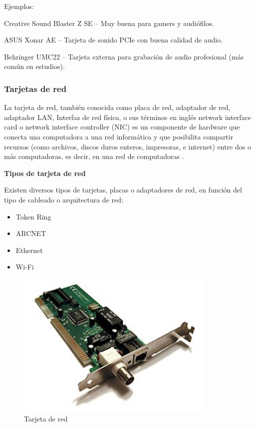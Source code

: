 Ejemplos:

Creative Sound Blaster Z SE – Muy buena para gamers y audiófilos.

ASUS Xonar AE – Tarjeta de sonido PCIe con buena calidad de audio.

Behringer UMC22 – Tarjeta externa para grabación de audio profesional (más común en estudios).

\subsubsection{Tarjetas de red}

La tarjeta de red, también conocida como placa de red, adaptador de red, adaptador LAN, Interfaz de red física, o sus términos en inglés network interface card o network interface controller (NIC) es un componente de hardware que conecta una computadora a una red informática y que posibilita compartir recursos (como archivos, discos duros enteros, impresoras, e internet) entre dos o más computadoras, es decir, en una red de computadoras \cite{wikitarjred}.

\textbf{Tipos de tarjeta de red}

Existen diversos tipos de tarjetas, placas o adaptadores de red, en función del tipo de cableado o arquitectura de red:

\begin{itemize}
  \item Token Ring
  \item ARCNET
  \item Ethernet
  \item Wi-Fi
\end{itemize}

\begin{figure}[H]
  \centering
  \includegraphics[scale=0.8]{imagenes/tarjeta-red.png}
  \caption{Tarjeta de red}
\end{figure}

